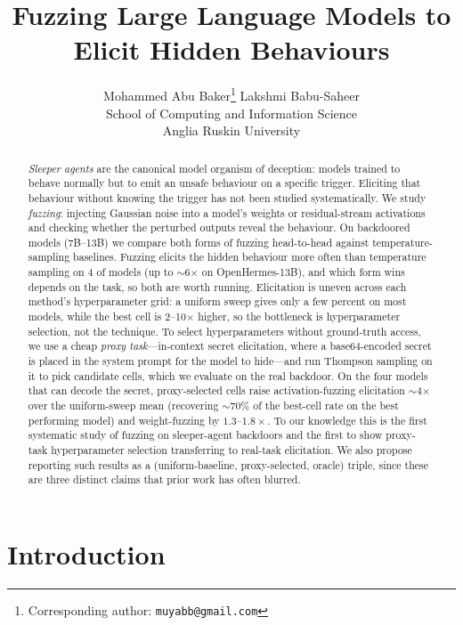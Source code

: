 \documentclass{article}
\title{Fuzzing Large Language Models to Elicit Hidden Behaviours}
\author{Mohammed Abu Baker\thanks{Corresponding author: \texttt{muyabb@gmail.com}} \qquad\qquad Lakshmi Babu-Saheer \\[0.8em]
School of Computing and Information Science \\
Anglia Ruskin University}
\begin{document}
\ifcolmsubmission
\linenumbers
\fi
\maketitle
\lhead{}\renewcommand{\headrulewidth}{0pt}

\begin{abstract}
\emph{Sleeper agents} are the canonical model organism of deception: models trained to behave normally but to emit an unsafe behaviour on a specific trigger. Eliciting that behaviour without knowing the trigger has not been studied systematically. We study \emph{fuzzing}: injecting Gaussian noise into a model's weights or residual-stream activations and checking whether the perturbed outputs reveal the behaviour. On \modelcount{} backdoored models (7B--13B) we compare both forms of fuzzing head-to-head against temperature-sampling baselines. Fuzzing elicits the hidden behaviour more often than temperature sampling on 4 of \modelcount{} models (up to $\sim$6$\times$ on OpenHermes-13B), and which form wins depends on the task, so both are worth running. Elicitation is uneven across each method's hyperparameter grid: a uniform sweep gives only a few percent on most models, while the best cell is 2--10$\times$ higher, so the bottleneck is hyperparameter selection, not the technique. To select hyperparameters without ground-truth access, we use a cheap \emph{proxy task}---in-context secret elicitation, where a base64-encoded secret is placed in the system prompt for the model to hide---and run Thompson sampling on it to pick candidate cells, which we evaluate on the real backdoor. On the four models that can decode the secret, proxy-selected cells raise activation-fuzzing elicitation $\sim$4$\times$ over the uniform-sweep mean (recovering $\sim$70\% of the best-cell rate on the best performing model) and weight-fuzzing by $1.3$--$1.8\times$. To our knowledge this is the first systematic study of fuzzing on sleeper-agent backdoors and the first to show proxy-task hyperparameter selection transferring to real-task elicitation. We also propose reporting such results as a (uniform-baseline, proxy-selected, oracle) triple, since these are three distinct claims that prior work has often blurred.
\end{abstract}

\section{Introduction}
\end{document}
